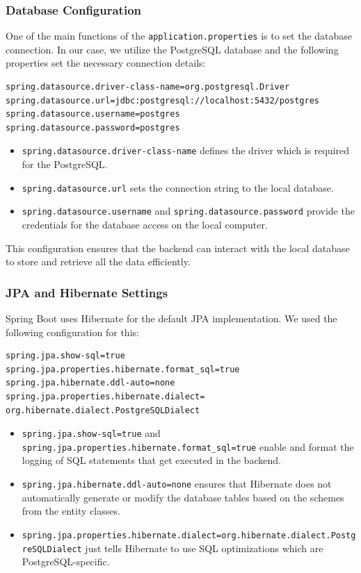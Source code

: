         \subsubsection{Database Configuration}
        One of the main functions of the \texttt{application.properties} is to set the database connection. In our case, we utilize the PostgreSQL database and the following properties set the necessary connection details:
        \lstset{style=springproperties, caption=Database Configuration}
        \begin{verbatim}
spring.datasource.driver-class-name=org.postgresql.Driver
spring.datasource.url=jdbc:postgresql://localhost:5432/postgres
spring.datasource.username=postgres
spring.datasource.password=postgres
        \end{verbatim}
        \begin{itemize}
            \item \texttt{spring.datasource.driver-class-name} defines the driver which is required for the PostgreSQL.
            \item \texttt{spring.datasource.url} sets the connection string to the local database.
            \item \texttt{spring.datasource.username} and \texttt{spring.datasource.password} provide the credentials for the database access on the local computer.
        \end{itemize}
        This configuration ensures that the backend can interact with the local database to store and retrieve all the data efficiently.

        \subsubsection{JPA and Hibernate Settings}
        Spring Boot uses Hibernate for the default JPA implementation. We used the following configuration for this:
        \lstset{style=springproperties, caption=JPA/Hibernate Settings}
        \begin{verbatim}
spring.jpa.show-sql=true
spring.jpa.properties.hibernate.format_sql=true
spring.jpa.hibernate.ddl-auto=none
spring.jpa.properties.hibernate.dialect= org.hibernate.dialect.PostgreSQLDialect
        \end{verbatim} 

        \begin{itemize}
            \item \texttt{spring.jpa.show-sql=true} and \newline \texttt{spring.jpa.properties.hibernate.format\_sql=true} enable and format the logging of SQL statements that get executed in the backend.
            \item \texttt{spring.jpa.hibernate.ddl-auto=none} ensures that Hibernate does not automatically generate or modify the database tables based on the schemes from the entity classes.
            \item \texttt{spring.jpa.properties.hibernate.dialect=org.hibernate.dialect.PostgreSQLDialect} just tells Hibernate to use SQL optimizations which are PostgreSQL-specific.
        \end{itemize}
        
